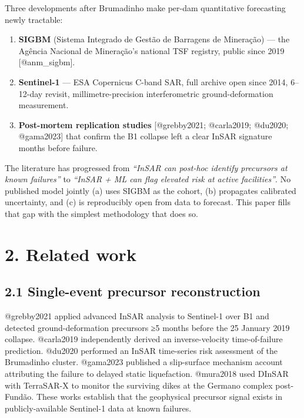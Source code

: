 \documentclass[
  11pt]{article}
\providecommand{\tightlist}{%
  \setlength{\itemsep}{0pt}\setlength{\parskip}{0pt}}
\begin{document}
Three developments after Brumadinho make per-dam quantitative
forecasting newly tractable:

\begin{enumerate}
\def\labelenumi{\arabic{enumi}.}
\tightlist
\item
  \textbf{SIGBM} (Sistema Integrado de Gestão de Barragens de Mineração)
  --- the Agência Nacional de Mineração's national TSF registry, public
  since 2019 {[}@anm\_sigbm{]}.
\item
  \textbf{Sentinel-1} --- ESA Copernicus C-band SAR, full archive open
  since 2014, 6--12-day revisit, millimetre-precision interferometric
  ground-deformation measurement.
\item
  \textbf{Post-mortem replication studies} {[}@grebby2021; @carla2019;
  @du2020; @gama2023{]} that confirm the B1 collapse left a clear InSAR
  signature months before failure.
\end{enumerate}

The literature has progressed from \emph{``InSAR can post-hoc identify
precursors at known failures''} to \emph{``InSAR + ML can flag elevated
risk at active facilities''}. No published model jointly (a) uses SIGBM
as the cohort, (b) propagates calibrated uncertainty, and (c) is
reproducibly open from data to forecast. This paper fills that gap with
the simplest methodology that does so.

\section{2. Related work}\label{related-work}

\subsection{2.1 Single-event precursor
reconstruction}\label{single-event-precursor-reconstruction}

@grebby2021 applied advanced InSAR analysis to Sentinel-1 over B1 and
detected ground-deformation precursors ≥5 months before the 25 January
2019 collapse. @carla2019 independently derived an inverse-velocity
time-of-failure prediction. @du2020 performed an InSAR time-series risk
assessment of the Brumadinho cluster. @gama2023 published a slip-surface
mechanism account attributing the failure to delayed static
liquefaction. @mura2018 used DInSAR with TerraSAR-X to monitor the
surviving dikes at the Germano complex post-Fundão. These works
establish that the geophysical precursor signal exists in
publicly-available Sentinel-1 data at known failures.
\end{document}
